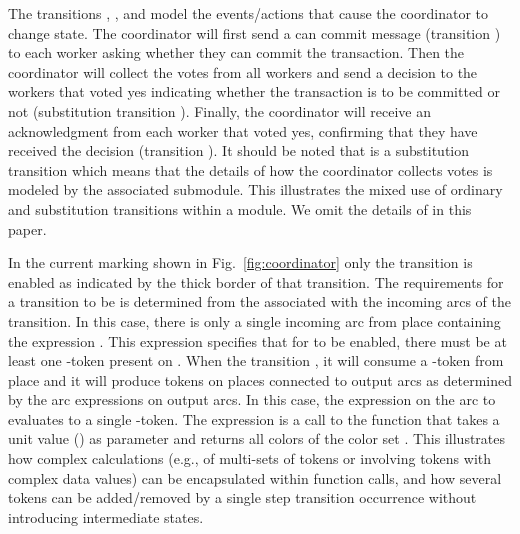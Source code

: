 The transitions , , and
 model the
events/actions that cause the coordinator to change state. The
coordinator will first send a can commit message (transition
) to each worker asking whether they can commit
the transaction. Then the coordinator will collect the votes from all
workers and send a decision to the workers that voted yes indicating
whether the transaction is to be committed or not (substitution
transition ). Finally, the coordinator will
receive an acknowledgment from each worker that voted yes, confirming
that they have received the decision (transition
).  It should be noted that
 is a substitution transition which means that
the details of how the coordinator collects votes is modeled by the
associated  submodule. This illustrates the
mixed use of ordinary and substitution transitions within a module. We
omit the details of  in this paper.


In the current marking shown in Fig.~\ref{fig:coordinator} only the
transition  is enabled as indicated by the
thick border of that transition. The requirements for a transition to
be  is determined from the 
associated with the incoming arcs of the transition. In this case,
there is only a single incoming arc from place 
containing the expression \smlcode{()}. This expression specifies that
for  to be enabled, there must be at least one
\smlcode{()}-token present on . When the
 transition , it will consume a
\smlcode{()}-token from place  and it will produce
tokens on places connected to output arcs as determined by
 the arc expressions on output arcs. In this case,
the expression \smlcode{()} on the arc to 
evaluates to a single \smlcode{()}-token. The expression
 is a call to the function 
that takes a unit value (\smlcode{()}) as parameter and returns all
colors of the color set . This illustrates how complex
calculations (e.g., of multi-sets of tokens or involving tokens with
complex data values) can be encapsulated within function calls, and
how several tokens can be added/removed by a single step transition
occurrence without introducing intermediate states.

